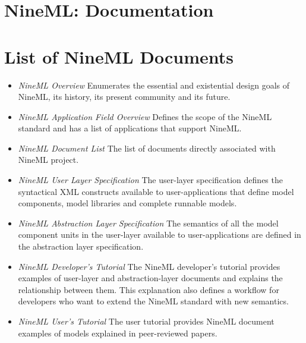 \documentclass[12pt]{article}
\begin{document}
\section*{NineML: Documentation}

\section{List of NineML Documents}

\begin{itemize}
\item {\em NineML Overview} Enumerates the essential and existential
  design goals of NineML, its history, its present community and its
  future.
\item {\em NineML Application Field Overview} Defines the scope of the
  NineML standard and has a list of applications that support NineML.
\item {\em NineML Document List} The list of documents directly
  associated with NineML project.
\item {\em NineML User Layer Specification} The user-layer
  specification defines the syntactical XML constructs available to
  user-applications that define model components, model libraries and
  complete runnable models.
\item {\em NineML Abstraction Layer Specification} The semantics of
  all the model component units in the user-layer available to
  user-applications are defined in the abstraction layer
  specification.
\item {\em NineML Developer's Tutorial} The NineML developer's
  tutorial provides examples of user-layer and abstraction-layer
  documents and explains the relationship between them.  This
  explanation also defines a workflow for developers who want to
  extend the NineML standard with new semantics.
\item {\em NineML User's Tutorial} The user tutorial provides NineML
  document examples of models explained in peer-reviewed papers.
\end{itemize}
\end{document}

